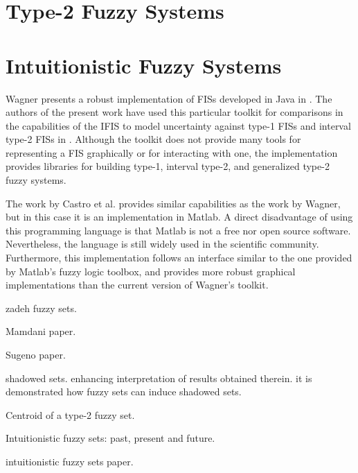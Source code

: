 \section{Type-2 Fuzzy Systems}
\label{section:type-2-fuzzy-systems}

\section{Intuitionistic Fuzzy Systems}
\label{section:related-work-intuitionistic-fuzzy-systems}

Wagner presents a robust implementation of FISs developed in Java in
\cite{Wagner2013}. The authors of the present work have used this particular
toolkit for comparisons in the capabilities of the IFIS to model uncertainty
against type-1 FISs and interval type-2 FISs in
\cite{Hernandez-Aguila2016}. Although the toolkit does not provide many tools
for representing a FIS graphically or for interacting with one, the
implementation provides libraries for building type-1, interval type-2, and
generalized type-2 fuzzy systems.

The work by Castro et al. \cite{castro2007interval} provides similar
capabilities as the work by Wagner, but in this case it is an implementation in
Matlab. A direct disadvantage of using this programming language is that Matlab
is not a free nor open source software.  Nevertheless, the language is still
widely used in the scientific community. Furthermore, this implementation
follows an interface similar to the one provided by Matlab's fuzzy logic
toolbox, and provides more robust graphical implementations than the current
version of Wagner's toolkit.


\cite{Zadeh1965} zadeh fuzzy sets.

\cite{Mamdani1975} Mamdani paper.

\cite{Takagi1985} Sugeno paper.


\cite{Pedrycz1998} shadowed sets. enhancing interpretation of results
obtained therein. it is demonstrated how fuzzy
sets can induce shadowed sets.

\cite{Karnik2001} Centroid of a type-2 fuzzy set.

\cite{Atanassov2003} Intuitionistic fuzzy sets: past, present and future.

\cite{Atanassov1986} intuitionistic fuzzy sets paper.

